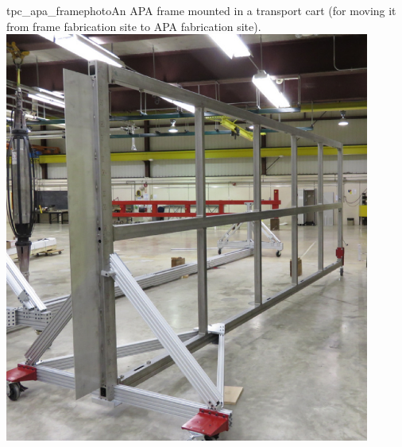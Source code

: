 \begin{cdrfigure}{tpc_apa_framephoto}{An APA frame mounted in a transport cart (for moving it from frame fabrication site to APA fabrication site).}
\includegraphics[width=0.9\textwidth]{figures/tpc_apa_framephoto.png} 
\end{cdrfigure}



